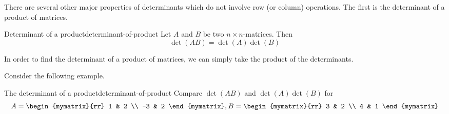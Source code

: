 There are several other major properties of determinants which do not
involve row (or column) operations. The first is the determinant of a
product of matrices.

\begin{theorem}{Determinant of a product}{determinant-of-product}
  Let $A$ and $B$ be two $n\times n$-matrices. Then
  \begin{equation*}
    \det(AB) =\det(A) \det(B)
  \end{equation*}
\end{theorem}

In order to find the determinant of a product of matrices, we can
simply take the product of the determinants.

Consider the following example.

\begin{example}{The determinant of a product}{determinant-of-product}
  Compare $\det(AB) $ and $\det(A) \det(
  B) $ for
  \begin{equation*}
    A=\begin{mymatrix}{rr}
      1 & 2 \\
      -3 & 2
    \end{mymatrix} ,B=\begin{mymatrix}{rr}
      3 & 2 \\
      4 & 1
    \end{mymatrix}
  \end{equation*}
\end{example}

